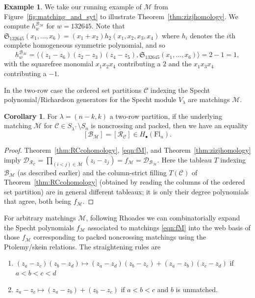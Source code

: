 \documentclass[11pt]{amsart}
\theoremstyle{definition}
\newtheorem{cor}[thm]{Corollary}
\newtheorem{eg}[thm]{Example}
\numberwithin{equation}{section}
\newcommand{\fl}[1]{\mathrm{Fl}_{#1}}
\begin{document}
\begin{eg}
\label{eg:132645}
    We take our running example of $\mathcal{M}$ from Figure~\ref{fig:matching_and_syt} to illustrate Theorem~\ref{thm:zizjhomology}.
    We compute $h^{\mathcal{B}_\mathcal{M}}_w$ for $w=132645$. Note that $\mathfrak{S}_{132645}(x_1,\ldots,x_6)=(x_1+x_2)h_2(x_1,x_2,x_3,x_4)$ where $h_i$ denotes the $i$th complete homogeneous symmetric polynomial, and so
    \[
        h^{\mathcal{B}_\mathcal{M}}_w=\langle (z_1-z_6)(z_2-z_3)(z_4-z_5), \mathfrak{S}_{132645}(x_1,\ldots,x_6)\rangle=2-1=1,
    \]
    with the squarefree monomial $x_1x_2x_4$ contributing a $2$ and the $x_1x_3x_4$ contributing a $-1$.
\end{eg}
In the two-row case the ordered set partitions $\mathcal{C}$ indexing the Specht polynomial/Richardson generators for the Specht module $V_\lambda$ are matchings $\mathcal{M}$.
\begin{cor}
\label{cor:BmRcequation}
    For $\lambda=(n-k,k)$ a two-row partition, if the underlying matching $\mathcal{M}$ for $\mathcal{C}\in S_{\lambda^{\top}}\setminus S_n$ is noncrossing and packed, then we have an equality
$$[\mathcal{B}_{\mathcal{M}}]=[\mathcal{R}_{\mathcal{C}}]\in H_\bullet(\fl{n}).$$
\end{cor}
\begin{proof}
Theorem~\ref{thm:RCcohomology}, \eqref{eqn:fM}, and Theorem~\ref{thm:zizjhomology} imply $\mathcal{D}_{\mathcal{R}_{\mathcal{C}}}=\prod_{(i<j)\in \mathcal{M}}(z_i-z_j)=f_{\mathcal{M}}=\mathcal{D}_{\mathcal{B}_\mathcal{M}}$. Here the tableau $T$ indexing $\mathcal{B}_\mathcal{M}$ (as described earlier) and the column-strict filling $T(\mathcal{C})$ of Theorem~\ref{thm:RCcohomology} (obtained by reading the columns of the ordered set partition) are in general different tableaux; it is only their degree polynomials that agree, both being $f_\mathcal{M}$.
\end{proof}
For arbitrary matchings $\mathcal{M}$, following Rhoades \cite{Rho19} we can combinatorially expand the Specht polynomials $f_{\mathcal{M}}$ associated to matchings \eqref{eqn:fM} into the web basis of those $f_\mathcal{M}$ corresponding to packed noncrossing matchings using the Ptolemy/skein relations.
The straightening rules are
\begin{enumerate}
    \item $(z_a-z_c)(z_b-z_d)\mapsto (z_a-z_d)(z_b-z_c)+(z_a-z_b)(z_c-z_d)$ if $a<b<c<d$
    \item $z_a-z_c\mapsto (z_a-z_b)+(z_b-z_c)$ if $a<b<c$ and $b$ is unmatched.
\end{enumerate}
\end{document}
